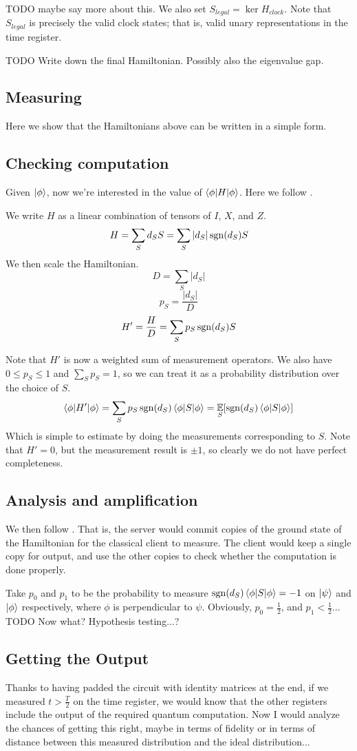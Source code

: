 TODO maybe say more about this.
We also set $S_{legal}=\ker H_{clock}$. Note that $S_{legal}$ is precisely the valid clock states; that is, valid unary representations in the time register.

TODO Write down the final Hamiltonian. Possibly also the eigenvalue gap.

\subsection{Measuring}

Here we show that the Hamiltonians above can be written in a simple form.




\subsection{Checking computation}

Given $\ket\phi$, now we're interested in the value of $\braket{\phi|H|\phi}$. Here we follow \cite{PhysRevA.93.022326}.

We write $H$ as a linear combination of tensors of $I$, $X$, and $Z$.
$$H=\sum_S d_S S= \sum_S |d_S|\operatorname{sgn}(d_S)S$$
We then scale the Hamiltonian.
$$D=\sum_S|d_S|$$
$$p_S=\frac{|d_S|}{D}$$
$$H'=\frac{H}{D}=\sum_S p_S\operatorname{sgn}(d_S)S$$

Note that $H'$ is now a weighted sum of measurement operators. We also have $0\leq p_S\leq1$ and $\sum_S p_S=1$, so we can treat it as a probability distribution over the choice of $S$.
$$\braket{\phi|H'|\phi}=\sum_S p_S\operatorname{sgn}(d_S)\braket{\phi|S|\phi}=\operatorname*{\mathbb{E}}_S[\operatorname{sgn}(d_S)\braket{\phi|S|\phi}]$$
Which is simple to estimate by doing the measurements corresponding to $S$.
Note that $H'=0$, but the measurement result is $\pm1$, so clearly we do not have perfect completeness.

\subsection{Analysis and amplification}

We then follow \cite{mahadev_delegation}. That is, the server would commit copies of the ground state of the Hamiltonian for the classical client to measure.
The client would keep a single copy for output, and use the other copies to check whether the computation is done properly.

Take $p_0$ and $p_1$ to be the probability to measure $\operatorname{sgn}(d_S)\braket{\phi|S|\phi}=-1$ on $\ket\psi$ and $\ket\phi$ respectively, where $\phi$ is perpendicular to $\psi$. Obviously, $p_0=\frac{1}{2}$, and $p_1<\frac{1}{2}$... TODO Now what? Hypothesis testing...?

\subsection{Getting the Output}

Thanks to having padded the circuit with identity matrices at the end, if we measured $t>\frac{T}{2}$ on the time register, we would know that the other registers include the output of the required quantum computation. Now I would analyze the chances of getting this right, maybe in terms of fidelity or in terms of distance between this measured distribution and the ideal distribution...

